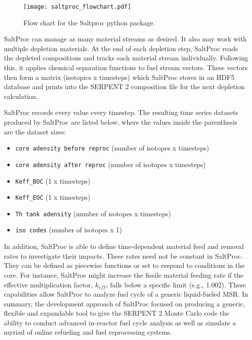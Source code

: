 \begin{figure}[ht!] %
  \texttt{[image: saltproc\_flowchart.pdf]}
  \caption{Flow chart for the Saltproc python package.}
  \label{fig:saltproc_flow}
\end{figure}
SaltProc can manage as many material streams as desired. It also may work with 
multiple depletion materials. At the end of each depletion step, SaltProc 
reads the depleted compositions and tracks each material stream individually. 
Following this, it applies chemical separation functions to fuel stream 
vectors. These vectors then form a matrix (isotopics x timesteps) which 
SaltProc stores in an HDF5 database and prints into the SERPENT 2 composition 
file for the next depletion calculation.

SaltProc records every value every timestep. The resulting time series datasets
produced by SaltProc are listed below,
where the values inside the parenthesis are the dataset sizes:

\begin{itemize}
    \item \texttt{core adensity before reproc} (number of isotopes x timesteps)
    \item \texttt{core adensity after reproc} (number of isotopes x timesteps)
    \item \texttt{Keff\_BOC} (1 x timesteps)
    \item \texttt{Keff\_EOC} (1 x timesteps)
    \item \texttt{Th tank adensity} (number of isotopes x timesteps)
    \item \texttt{iso codes} (number of isotopes x 1)
\end{itemize}

In addition, SaltProc is able to define time-dependent material feed and 
removal rates to investigate their impacts. These rates need not be 
constant in SaltProc. They can be defined as piecewise functions or set to 
respond to conditions in the core. For instance, SaltProc might increase the 
fissile material feeding rate if the effective multiplication factor, 
$k_{eff}$, falls below a specific limit (e.g., 1.002).
These capabilities allow SaltProc to analyze fuel cycle of a generic 
liquid-fueled \gls{MSR}. In summary, the development approach of SaltProc 
focused on producing a generic, flexible and expandable tool to give the 
SERPENT 2 Monte Carlo code the ability to conduct advanced in-reactor fuel 
cycle analysis as well as simulate a myriad of online refueling and fuel 
reprocessing systems.
